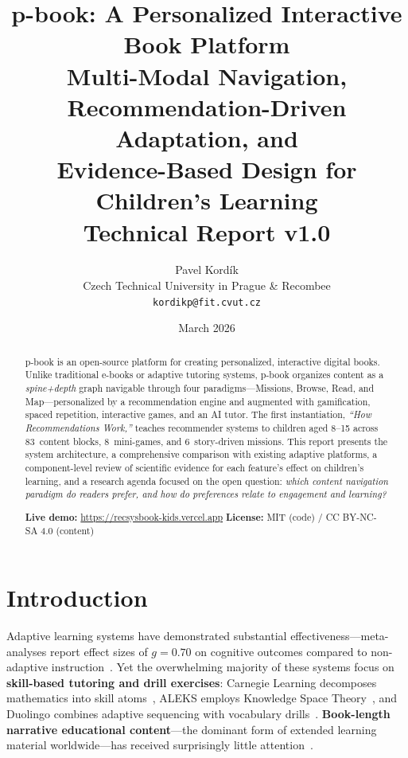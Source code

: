 \documentclass[11pt,a4paper]{article}
\title{%
  \vspace{-1cm}
  {\LARGE\bfseries p-book: A Personalized Interactive Book Platform}\\[0.3em]
  {\Large Multi-Modal Navigation, Recommendation-Driven Adaptation, and\\Evidence-Based Design for Children's Learning}\\[0.5em]
  {\large Technical Report v1.0}
}
\author{%
  Pavel Kord\'{i}k\\
  Czech Technical University in Prague \& Recombee\\
  \texttt{kordikp@fit.cvut.cz}
}
\date{March 2026}
\begin{document}
\maketitle

\begin{abstract}
\noindent p-book is an open-source platform for creating personalized, interactive digital books. Unlike traditional e-books or adaptive tutoring systems, p-book organizes content as a \emph{spine+depth} graph navigable through four paradigms---Missions, Browse, Read, and Map---personalized by a recommendation engine and augmented with gamification, spaced repetition, interactive games, and an AI tutor. The first instantiation, \emph{``How Recommendations Work,''} teaches recommender systems to children aged 8--15 across 83~content blocks, 8~mini-games, and 6~story-driven missions. This report presents the system architecture, a comprehensive comparison with existing adaptive platforms, a component-level review of scientific evidence for each feature's effect on children's learning, and a research agenda focused on the open question: \emph{which content navigation paradigm do readers prefer, and how do preferences relate to engagement and learning?}

\medskip
\noindent\textbf{Live demo:} \url{https://recsysbook-kids.vercel.app} \hfill \textbf{License:} MIT (code) / CC BY-NC-SA 4.0 (content)
\end{abstract}

\tableofcontents
\newpage

\section{Introduction}

Adaptive learning systems have demonstrated substantial effectiveness---meta-analyses report effect sizes of $g{=}0.70$ on cognitive outcomes compared to non-adaptive instruction~\cite{wang2024}. Yet the overwhelming majority of these systems focus on \textbf{skill-based tutoring and drill exercises}: Carnegie Learning decomposes mathematics into skill atoms~\cite{ritter2007}, ALEKS employs Knowledge Space Theory~\cite{cosyn2021}, and Duolingo combines adaptive sequencing with vocabulary drills~\cite{settles2016}. \textbf{Book-length narrative educational content}---the dominant form of extended learning material worldwide---has received surprisingly little attention~\cite{sosnovsky2025}.
\end{document}
